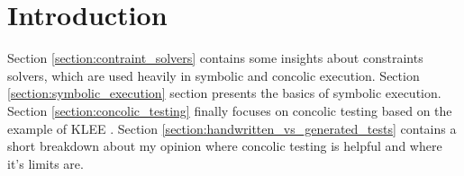 \section{Introduction}

Section \ref{section:contraint_solvers} contains some insights about constraints solvers, which are used heavily in symbolic and concolic execution.
Section \ref{section:symbolic_execution} section presents the basics of symbolic execution.
Section \ref{section:concolic_testing} finally focuses on concolic testing based on the example of KLEE \cite{Cadar:2008:KUA:1855741.1855756}. 
Section \ref{section:handwritten_vs_generated_tests} contains a short breakdown about my opinion where concolic testing is helpful and where it's limits are.

